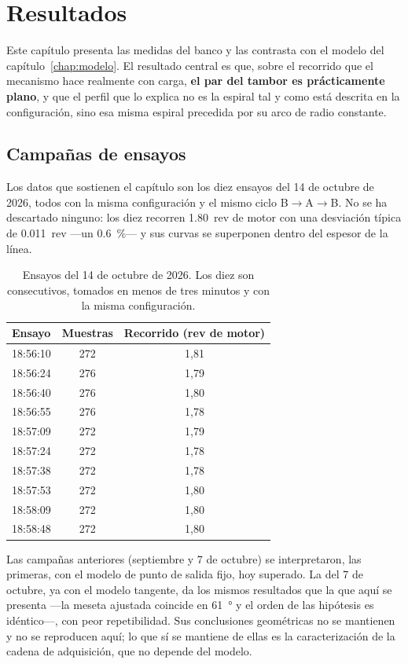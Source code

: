 \chapter{Resultados}
\label{chap:resultados}

Este capítulo presenta las medidas del banco y las contrasta con el modelo del
capítulo~\ref{chap:modelo}. El resultado central es que, sobre el recorrido que el mecanismo hace
realmente con carga, \textbf{el par del tambor es prácticamente plano}, y que el perfil que lo
explica no es la espiral tal y como está descrita en la configuración, sino esa misma espiral
precedida por su arco de radio constante.

\section{Campañas de ensayos}
\label{sec:res-campania}

Los datos que sostienen el capítulo son los diez ensayos del 14 de octubre de 2026, todos con la
misma configuración y el mismo ciclo B$\to$A$\to$B. No se ha descartado ninguno: los diez recorren
\SI{1.80}{rev} de motor con una desviación típica de \SI{0.011}{rev} ---un \SI{0.6}{\percent}--- y
sus curvas se superponen dentro del espesor de la línea.

\begin{table}[H]
\centering
\caption{Ensayos del 14 de octubre de 2026. Los diez son consecutivos, tomados en menos de tres
minutos y con la misma configuración.}
\label{tab:ensayos}
\small
\begin{tabular}{@{}lcc@{}}
\toprule
Ensayo & Muestras & Recorrido (rev de motor) \\
\midrule
18:56:10 & 272 & 1,81 \\
18:56:24 & 276 & 1,79 \\
18:56:40 & 276 & 1,80 \\
18:56:55 & 276 & 1,78 \\
18:57:09 & 272 & 1,79 \\
18:57:24 & 272 & 1,78 \\
18:57:38 & 272 & 1,78 \\
18:57:53 & 272 & 1,80 \\
18:58:09 & 272 & 1,80 \\
18:58:48 & 272 & 1,80 \\
\bottomrule
\end{tabular}
\end{table}

Las campañas anteriores (septiembre y 7 de octubre) se interpretaron, las primeras, con el modelo de
punto de salida fijo, hoy superado. La del 7 de octubre, ya con el modelo tangente, da los mismos
resultados que la que aquí se presenta ---la meseta ajustada coincide en \SI{61}{\degree} y el orden
de las hipótesis es idéntico---, con peor repetibilidad. Sus conclusiones
geométricas no se mantienen y no se reproducen aquí; lo que sí se mantiene de ellas es la
caracterización de la cadena de adquisición, que no depende del modelo.

